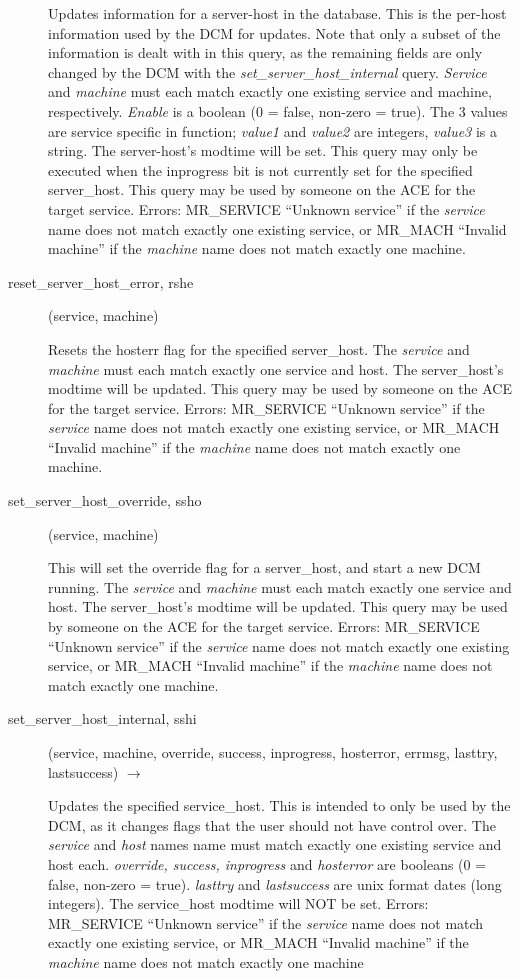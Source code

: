 \documentclass{article}
\begin{document}
\begin{description}
Updates information for a server-host in the database.  This is the
per-host information used by the DCM for updates.  Note that only a
subset of the information is dealt with in this query, as the
remaining fields are only changed by the DCM with the
{\em set\_server\_host\_internal} query.  {\em Service} and {\em machine} must
each match exactly one existing service and machine, respectively.
{\em Enable} is a boolean (0 = false, non-zero = true).  The 3 values
are service specific in function; {\em value1} and {\em value2} are
integers, {\em value3} is a string.  The server-host's modtime will be
set.  This query may only be executed when the inprogress bit is not
currently set for the specified server\_host.  This query may be used
by someone on the ACE for the target service.  Errors: MR\_SERVICE
``Unknown service'' if the {\em service} name does not match exactly one
existing service, or MR\_MACH ``Invalid machine'' if the {\em machine}
name does not match exactly one machine.


\item[reset\_server\_host\_error, rshe](service, machine)

Resets the hosterr flag for the specified server\_host.  The
{\em service} and {\em machine} must each match exactly one service and
host.  The server\_host's modtime will be updated.  This query may be
used by someone on the ACE for the target service.  Errors:
MR\_SERVICE ``Unknown service'' if the {\em service} name does not match
exactly one existing service, or MR\_MACH ``Invalid machine'' if the
{\em machine} name does not match exactly one machine.

\item[set\_server\_host\_override, ssho](service, machine)

This will set the override flag for a server\_host, and start a new DCM
running.  The {\em service} and {\em machine} must each match exactly one
service and host.  The server\_host's modtime will be updated.  This
query may be used by someone on the ACE for the target service.
Errors: MR\_SERVICE ``Unknown service'' if the {\em service} name does not
match exactly one existing service, or MR\_MACH ``Invalid machine'' if
the {\em machine} name does not match exactly one machine.

\item[set\_server\_host\_internal, sshi](service, machine, override,
success, inprogress, hosterror, errmsg, lasttry, lastsuccess)
$\rightarrow$

Updates the specified service\_host.  This is intended to only be used
by the DCM, as it changes flags that the user should not have control
over.  The {\em service} and {\em host} names name must match exactly one
existing service and host each.  {\em override, success, inprogress} and
{\em hosterror} are booleans (0 = false, non-zero = true).  {\em lasttry}
and {\em lastsuccess} are unix format dates (long integers).  The
service\_host modtime will NOT be set.  Errors: MR\_SERVICE ``Unknown
service'' if the {\em service} name does not match exactly one existing
service, or MR\_MACH ``Invalid machine'' if the {\em machine} name does
not match exactly one machine


\end{description}
\end{document}
